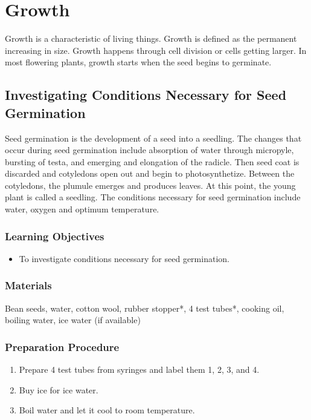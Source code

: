 \section{Growth}
Growth is a characteristic of living things. Growth is defined as the permanent increasing in size. Growth happens through cell division or cells getting larger. In most flowering plants, growth starts when the seed begins to germinate.

\subsection{Investigating Conditions Necessary for Seed Germination}
Seed germination is the development of a seed into a seedling. The changes that occur during seed germination include absorption of water through micropyle, bursting of testa, and emerging and elongation of the radicle. Then seed coat is discarded and cotyledons open out and begin to photosynthetize. Between the cotyledons, the plumule emerges and produces leaves. At this point, the young plant is called a seedling. The conditions necessary for seed germination include water, oxygen and optimum temperature.

\subsubsection*{Learning Objectives}
\begin{itemize}
\item{To investigate conditions necessary for seed germination.}
\end{itemize}

\subsubsection*{Materials}
Bean seeds, water, cotton wool, rubber stopper*, 4 test tubes*, cooking oil, boiling water, ice water (if available)

\subsubsection*{Preparation Procedure}
\begin{enumerate}
\item{Prepare 4 test tubes from syringes and label them 1, 2, 3, and 4.}
\item{Buy ice for ice water.}
\item{Boil water and let it cool to room temperature.}
\end{enumerate}

